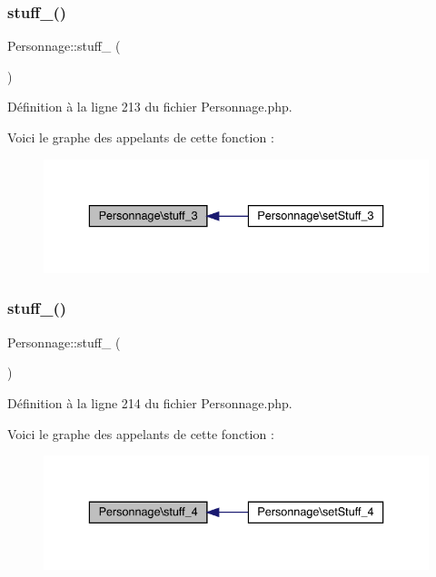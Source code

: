 \subsubsection{\texorpdfstring{stuff\+\_()}{stuff\_3()}}
{\footnotesize\ttfamily Personnage\+::stuff\+\_ (\begin{DoxyParamCaption}{ }\end{DoxyParamCaption})}



Définition à la ligne 213 du fichier Personnage.\+php.

Voici le graphe des appelants de cette fonction \+:\nopagebreak
\begin{figure}[H]
\begin{center}
\leavevmode
\includegraphics[width=336pt]{class_personnage_a5bc1399ae3e6d8f280b5df47e2c74a30_icgraph}
\end{center}
\end{figure}
\mbox{\label{class_personnage_a042a9e54be32c938eb10b6e69c5fd42f}} 
\subsubsection{\texorpdfstring{stuff\+\_()}{stuff\_4()}}
{\footnotesize\ttfamily Personnage\+::stuff\+\_ (\begin{DoxyParamCaption}{ }\end{DoxyParamCaption})}



Définition à la ligne 214 du fichier Personnage.\+php.

Voici le graphe des appelants de cette fonction \+:\nopagebreak
\begin{figure}[H]
\begin{center}
\leavevmode
\includegraphics[width=336pt]{class_personnage_a042a9e54be32c938eb10b6e69c5fd42f_icgraph}
\end{center}
\end{figure}
\mbox{\label{class_personnage_a0d4c73464508133a5e83f3e53085572c}} 

